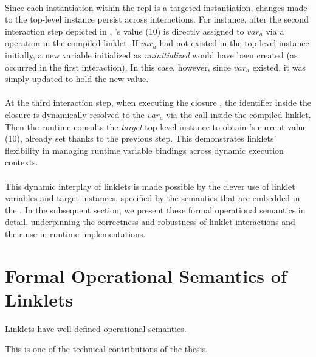 		\paragraph{}%
			Since each instantiation within the \gls{repl} is a targeted instantiation, changes made to the top-level instance persist across interactions. For instance, after the second interaction step depicted in , 's value (10) is directly assigned to $var_a$ via a  operation in the compiled linklet. If $var_a$ had not existed in the top-level instance initially, a new variable initialized as \emph{uninitialized} would have been created (as occurred in the first interaction). In this case, however, since $var_a$ existed, it was simply updated to hold the new value.

		\paragraph{}%
			At the third interaction step, when executing the closure , the identifier  inside the closure is dynamically resolved to the $var_a$ via the  call inside the compiled linklet. Then the runtime consults the \emph{target} top-level instance to obtain 's current value (10), already set thanks to the previous step. This demonstrates linklets' flexibility in managing runtime variable bindings across dynamic execution contexts.

		\paragraph{}%
			This dynamic interplay of linklets is made possible by the clever use of linklet variables and target instances, specified by the semantics that are embedded in the . In the subsequent section, we present these formal operational semantics in detail, underpinning the correctness and robustness of linklet interactions and their use in runtime implementations.


	\section[\texorpdfstring{Formal Operational Semantics of Linklets}{Formal Semantics for Linklets}]{Formal Operational Semantics of Linklets}

		\begin{mainpoint}
			Linklets have well-defined operational semantics.

			This is one of the technical contributions of the thesis.
		\end{mainpoint}

